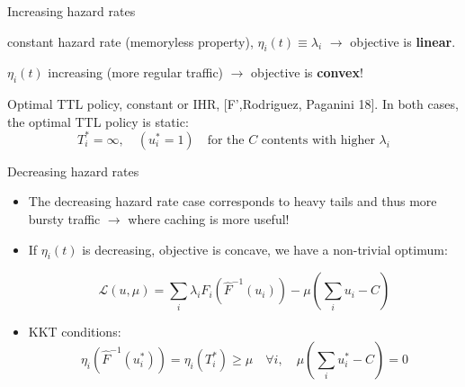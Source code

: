 \documentclass[aspectratio=169]{beamer}
\newenvironment*{myitem}[1][1.5em]{\begin{itemize}\setlength{\itemsep}{#1}}{\end{itemize}}
\begin{document}
\begin{frame}{Increasing hazard rates}
	
	\begin{description}\setlength{\itemsep}{1.5em}
		\item[\alert{Poisson arrivals:}] constant hazard rate (memoryless property), $\eta_i(t) \equiv \lambda_i$ $\to$ objective is \textbf{linear}. 
		\item[\alert{Increasing hazard rates:}] $\eta_i(t)$ increasing (more regular traffic) $\to$ objective is \textbf{convex}!
	\end{description}

	\vfill

	\begin{block}{Optimal TTL policy, constant or IHR, [F',Rodriguez, Paganini 18].}
	In both cases, the optimal TTL policy is \alert{static}:
	\begin{equation*}
		T_i^* = \infty, \quad (u_i^*=1) \quad \text{for the $C$ contents with higher } \lambda_i
	\end{equation*}
	\end{block}
\end{frame}

\begin{frame}{Decreasing hazard rates}

	\begin{myitem}[2em]
	\item The \alert{decreasing hazard rate} case corresponds to heavy tails and thus more bursty traffic $\to$ where caching is more useful!

	\item If $\eta_i(t)$ is \alert{decreasing}, objective is \alert{concave}, we have a non-trivial optimum:

	\begin{equation*}
		\mathcal{L}(u,\mu) = \sum_i \lambda_i F_i(\hat{F}^{-1}(u_i)) - \mu\left(\sum_i u_i - C\right)
	\end{equation*}

	\item KKT conditions:
	\begin{equation*}
		\eta_i(\hat{F}^{-1}(u_i^*)) = \eta_i(T_i^*) \geqslant \mu \quad \forall i, \quad \mu\left(\sum_i u_i^* -C\right) = 0
	\end{equation*}
	\end{myitem}
\end{frame}
\end{document}
